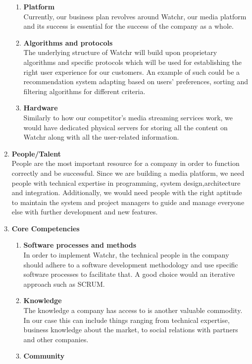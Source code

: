 \begin{enumerate}
  	\begin{enumerate}
   		\item \textbf{Platform}\\
Currently, our business plan revolves around Watchr, our media platform and its success is essential for the success of the company as a whole.
	    \item \textbf{Algorithms and protocols}\\ 
The underlying structure of Watchr will build upon proprietary algorithms and specific protocols which will be used for establishing the right user experience for our customers. An example of such could be a recommendation system adapting based on users' preferences, sorting and filtering algorithms for different criteria. 
    	\item \textbf{Hardware}\\
Similarly to how our competitor's media streaming services work, we would have dedicated physical servers for storing all the content on Watchr along with all the user-related information. 
  	\end{enumerate}
  \item \textbf{People/Talent}\\
People are the most important resource for a company in order to function correctly and be successful. Since we are building a media platform, we need people with technical expertise in programming, system design,architecture and integration. Additionally, we would need people with the right aptitude to maintain the system and project managers to guide and manage everyone else with further development and new features.
  \item \textbf{Core Competencies}
  	\begin{enumerate}
        	\item \textbf{Software processes and methods}\\
In order to implement Watchr, the technical people in the company should adhere to a software development methodology and use specific software processes to facilitate that. A good choice would an iterative approach such as SCRUM.
        	\item \textbf{Knowledge}\\
The knowledge a company has access to is another valuable commodity. In our case this can include things ranging from technical expertise, business knowledge about the market, to social relations with partners and other companies.
        	\item \textbf{Community}\\

\end{enumerate}
\end{enumerate}

